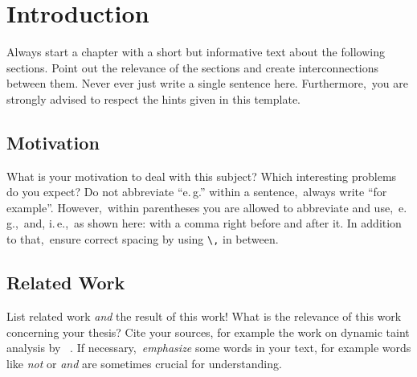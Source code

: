 \chapter{Introduction} \label{chap:intro}
Always start a chapter with a short but informative text about the following sections. Point out the relevance of the sections and create interconnections between them. Never ever just write a single sentence here. Furthermore,\ you are strongly advised to respect the hints given in this template.

\section{Motivation}
What is your motivation to deal with this subject? Which interesting problems do you expect? Do not abbreviate \enquote{e.\,g.\/} within a sentence,\ always write \enquote{for example}. However,\ within parentheses you are allowed to abbreviate and use,\ e.\,g.,\ and, i.\,e.,\ as shown here: with a comma right before and after it. In addition to that,\ ensure correct spacing by using \texttt{\textbackslash,} in between.

\section{Related Work}
List related work \emph{and} the result of this work! What is the relevance of this work concerning your thesis? Cite your sources, for example the work on dynamic taint analysis by \citeauthor{Newsome:05:DTA}~\cite{Newsome:05:DTA}. If necessary,\ \emph{emphasize} some words in your text, for example words like \emph{not} or \emph{and} are sometimes crucial for understanding.
